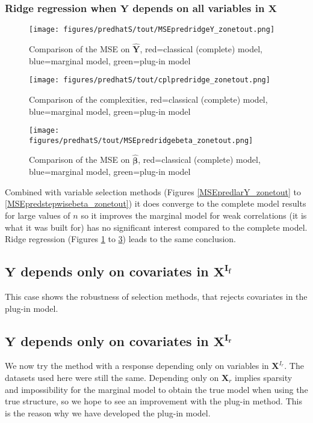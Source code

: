 \documentclass[12pt,a4paper]{report}
\begin{document}
\subsubsection{Ridge regression when $\boldsymbol{Y}$ depends on all variables in $\boldsymbol{X}$}

\begin{figure}[h!]
	\centering
		  \texttt{[image: figures/predhatS/tout/MSEpredridgeY\_zonetout.png]}
		\caption{Comparison of the MSE on $\hat{\boldsymbol{Y}}$, red=classical (complete) model, blue=marginal model, green=plug-in model}\label{MSEpredridgeY_zonetout}
	\end{figure}
	\begin{figure}[h!]
	\centering
		  \texttt{[image: figures/predhatS/tout/cplpredridge\_zonetout.png]}
		\caption{Comparison of the complexities, red=classical (complete) model, blue=marginal model, green=plug-in model}\label{cplpredridge_zonetout}
	\end{figure}
	\begin{figure}[h!]
	\centering
		  \texttt{[image: figures/predhatS/tout/MSEpredridgebeta\_zonetout.png]}
		\caption{Comparison of the MSE on $\hat{\boldsymbol{\beta}}$, red=classical (complete) model, blue=marginal model, green=plug-in model}\label{MSEpredridgebeta_zonetout}
	\end{figure}
	\FloatBarrier

\clearpage

Combined with variable selection methods (Figures \ref{MSEpredlarY_zonetout} to \ref{MSEpredstepwisebeta_zonetout}) it does converge to the complete model results for large values of $n$ so it improves the marginal model for weak correlations (it is what it was built for) has no significant interest compared to the complete model. Ridge regression (Figures \ref{MSEpredridgeY_zonetout} to \ref{MSEpredridgebeta_zonetout}) leads to the same conclusion.

\subsection{$\boldsymbol{Y}$ depends only on covariates in $\boldsymbol{X^{I_f}}$}	 \label{tableMSEsimdroitepred}
This case shows the robustness of selection methods, that rejects covariates in the plug-in model.\\ 

	
	\subsection{$\boldsymbol{Y}$ depends only on covariates in $\boldsymbol{X^{I_r}}$ }	 \label{tableMSEsimgauchepred}
We now try the method with a response depending only on variables in $\boldsymbol{X}^{I_r}$. The datasets used here were still the same.
Depending only on $\boldsymbol{X}_r$ implies sparsity and impossibility for the marginal model to obtain the true model when using the true structure, so we hope to see an improvement with the plug-in method. This is the reason why we have developed the plug-in model. \\
\end{document}
